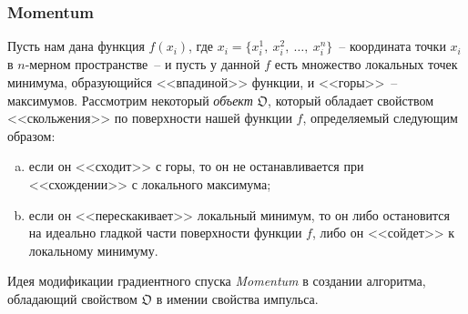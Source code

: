 \documentclass[12pt, a4paper, oneside, final]{article}
\begin{document}
	\subsubsection*{Momentum}
	Пусть нам дана функция $f(x_{i})$, где $x_{i} = \{x_{i}^{1}, ~ x_{i}^{2}, ~ \ldots, ~ x_{i}^{n}\}$~-- координата точки $x_{i}$ в $n$-мерном пространстве~-- и пусть у данной $f$ есть множество локальных точек минимума, образующийся <<впадиной>> функции, и <<горы>>~-- максимумов.
	Рассмотрим некоторый \textit{объект} $\mathfrak{O}$, который обладает свойством <<скольжения>> по поверхности нашей функции $f$, определяемый следующим образом:
	\begin{enumerate}[a)]
		\item если он <<сходит>> с горы, то он не останавливается при <<схождении>> с локального максимума;
		\item если он <<перескакивает>> локальный минимум, то он либо остановится на идеально гладкой части поверхности функции $f$, либо он <<сойдет>> к локальному минимуму.
	\end{enumerate}
	Идея модификации градиентного спуска \textit{Momentum} в создании алгоритма, обладающий свойством $\mathfrak{O}$ в имении свойства импульса.
\end{document}
